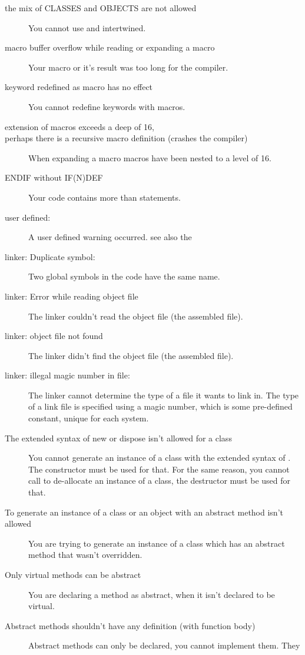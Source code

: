 \documentclass{report}
\begin{document}
\begin{description}
\item [the mix of CLASSES and OBJECTS are not allowed]
You cannot use  and  intertwined.
\item [macro buffer overflow while reading or expanding a macro]
Your macro or it's result  was too long for the compiler.
\item [keyword redefined as macro has no effect]
You cannot redefine keywords with macros.
\item [extension of macros exceeds a deep of 16,\\ perhaps there is a recursive macro definition (crashes the compiler)]
When expanding a macro macros have been nested to a level of 16.
\item [ENDIF without IF(N)DEF]
Your code contains more  than 
statements.
\item [user defined:]
A user defined warning occurred. see also the \progref
\item [linker: Duplicate symbol:]
Two global symbols in the code have the same name.
\item [linker: Error while reading object file]
The linker couldn't read the object file (the assembled file).
\item [linker: object file not found]
The linker didn't find the object file (the assembled file).
\item [linker: illegal magic number in file:]
The linker cannot determine the type of a file it wants to link in. The type
of a link file is specified using a magic number, which is some pre-defined
constant, unique for each system.
\item [The extended syntax of new or dispose isn't allowed for a class]
You cannot generate an instance of a class with the extended syntax of 
. The constructor must be used for that. For the same reason, you
cannot call  to de-allocate an instance of a class, the
destructor must be used for that.
\item [To generate an instance of a class or an object with an abstract method isn't allowed]
You are trying to generate an instance of a class which has an abstract
method that wasn't overridden.
\item [Only virtual methods can be abstract]
You are declaring a method as abstract, when it isn't declared to be
virtual.
\item [Abstract methods shouldn't have any definition (with function body)]
Abstract methods can only be declared, you cannot implement them. They

\end{description}
\end{document}
